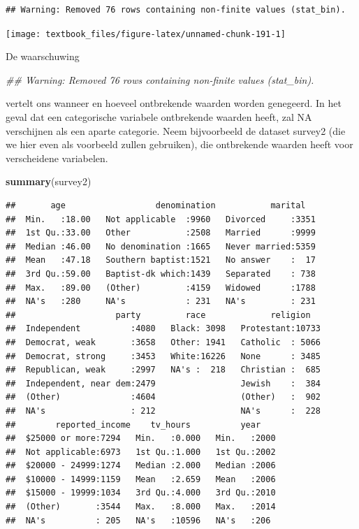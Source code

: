 \documentclass[]{tufte-book}
\newenvironment{Shaded}{}{}
\newcommand{\CommentTok}[1]{\textcolor[rgb]{0.38,0.63,0.69}{\textit{#1}}}
\newcommand{\KeywordTok}[1]{\textcolor[rgb]{0.00,0.44,0.13}{\textbf{#1}}}
\newcommand{\NormalTok}[1]{#1}
\begin{document}
\begin{verbatim}
## Warning: Removed 76 rows containing non-finite values (stat_bin).
\end{verbatim}

\texttt{[image: textbook\_files/figure-latex/unnamed-chunk-191-1]}

De waarschuwing

\begin{Shaded}
\begin{Highlighting}[]
\CommentTok{## Warning: Removed 76 rows containing non-finite values (stat_bin).}
\end{Highlighting}
\end{Shaded}

vertelt ons wanneer en hoeveel ontbrekende waarden worden genegeerd.
In het geval dat een categorische variabele ontbrekende waarden heeft, zal NA verschijnen als een aparte categorie. Neem bijvoorbeeld de dataset survey2 (die we hier even als voorbeeld zullen gebruiken), die ontbrekende waarden heeft voor verscheidene variabelen.

\begin{Shaded}
\begin{Highlighting}[]
\KeywordTok{summary}\NormalTok{(survey2)}
\end{Highlighting}
\end{Shaded}

\begin{verbatim}
##       age                  denomination           marital    
##  Min.   :18.00   Not applicable  :9960   Divorced     :3351  
##  1st Qu.:33.00   Other           :2508   Married      :9999  
##  Median :46.00   No denomination :1665   Never married:5359  
##  Mean   :47.18   Southern baptist:1521   No answer    :  17  
##  3rd Qu.:59.00   Baptist-dk which:1439   Separated    : 738  
##  Max.   :89.00   (Other)         :4159   Widowed      :1788  
##  NA's   :280     NA's            : 231   NA's         : 231  
##                    party         race             religion    
##  Independent          :4080   Black: 3098   Protestant:10733  
##  Democrat, weak       :3658   Other: 1941   Catholic  : 5066  
##  Democrat, strong     :3453   White:16226   None      : 3485  
##  Republican, weak     :2997   NA's :  218   Christian :  685  
##  Independent, near dem:2479                 Jewish    :  384  
##  (Other)              :4604                 (Other)   :  902  
##  NA's                 : 212                 NA's      :  228  
##        reported_income    tv_hours          year     
##  $25000 or more:7294   Min.   :0.000   Min.   :2000  
##  Not applicable:6973   1st Qu.:1.000   1st Qu.:2002  
##  $20000 - 24999:1274   Median :2.000   Median :2006  
##  $10000 - 14999:1159   Mean   :2.659   Mean   :2006  
##  $15000 - 19999:1034   3rd Qu.:4.000   3rd Qu.:2010  
##  (Other)       :3544   Max.   :8.000   Max.   :2014  
##  NA's          : 205   NA's   :10596   NA's   :206
\end{verbatim}
\end{document}
